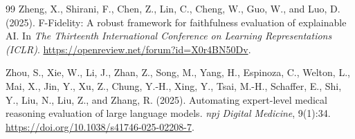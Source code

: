 \documentclass[10pt,a4paper,twoside]{article}
\begin{document}
\begin{thebibliography}{99}
Zheng, X., Shirani, F., Chen, Z., Lin, C., Cheng, W., Guo, W., and
Luo, D. (2025).
F-Fidelity: A robust framework for faithfulness evaluation of explainable AI.
In \emph{The Thirteenth International Conference on Learning
Representations (ICLR)}.
\url{https://openreview.net/forum?id=X0r4BN50Dv}.

Zhou, S., Xie, W., Li, J., Zhan, Z., Song, M., Yang, H., Espinoza, C.,
Welton, L., Mai, X., Jin, Y., Xu, Z., Chung, Y.-H., Xing, Y., Tsai, M.-H.,
Schaffer, E., Shi, Y., Liu, N., Liu, Z., and Zhang, R. (2025).
Automating expert-level medical reasoning evaluation of large language
models.
\emph{npj Digital Medicine}, 9(1):34.
\url{https://doi.org/10.1038/s41746-025-02208-7}.

\end{thebibliography}

\appendix

\end{document}
